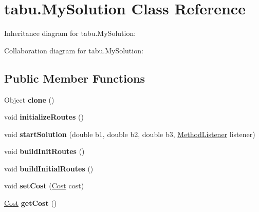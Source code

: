 \hypertarget{classtabu_1_1_my_solution}{}\section{tabu.\+My\+Solution Class Reference}
\label{classtabu_1_1_my_solution}


Inheritance diagram for tabu.\+My\+Solution\+:


Collaboration diagram for tabu.\+My\+Solution\+:
\subsection*{Public Member Functions}
\begin{DoxyCompactItemize}
\item 
Object {\bfseries clone} ()\hypertarget{classtabu_1_1_my_solution_a3e282041dc8467d75ca5e9cc636fda68}{}\label{classtabu_1_1_my_solution_a3e282041dc8467d75ca5e9cc636fda68}

\item 
void {\bfseries initialize\+Routes} ()\hypertarget{classtabu_1_1_my_solution_afcbd9b455ef92a42e3f218c4f453b306}{}\label{classtabu_1_1_my_solution_afcbd9b455ef92a42e3f218c4f453b306}

\item 
void {\bfseries start\+Solution} (double b1, double b2, double b3, \hyperlink{interfacesvrptw_1_1_method_listener}{Method\+Listener} listener)\hypertarget{classtabu_1_1_my_solution_a9dd36b133923d325a939c62ff7af2c37}{}\label{classtabu_1_1_my_solution_a9dd36b133923d325a939c62ff7af2c37}

\item 
void {\bfseries build\+Init\+Routes} ()\hypertarget{classtabu_1_1_my_solution_a29015d28a72da0d3147c6802bfb14ade}{}\label{classtabu_1_1_my_solution_a29015d28a72da0d3147c6802bfb14ade}

\item 
void {\bfseries build\+Initial\+Routes} ()\hypertarget{classtabu_1_1_my_solution_adbf05de092393cf23e7c9e9d49c2747d}{}\label{classtabu_1_1_my_solution_adbf05de092393cf23e7c9e9d49c2747d}

\item 
void {\bfseries set\+Cost} (\hyperlink{classsvrptw_1_1_cost}{Cost} cost)\hypertarget{classtabu_1_1_my_solution_ae0dab18a5fceb058e2fd3d6ffb985c69}{}\label{classtabu_1_1_my_solution_ae0dab18a5fceb058e2fd3d6ffb985c69}

\item 
\hyperlink{classsvrptw_1_1_cost}{Cost} {\bfseries get\+Cost} ()\hypertarget{classtabu_1_1_my_solution_ac8822d6a2a4c35a53cf32413203206e0}{}\label{classtabu_1_1_my_solution_ac8822d6a2a4c35a53cf32413203206e0}


\end{DoxyCompactItemize}
